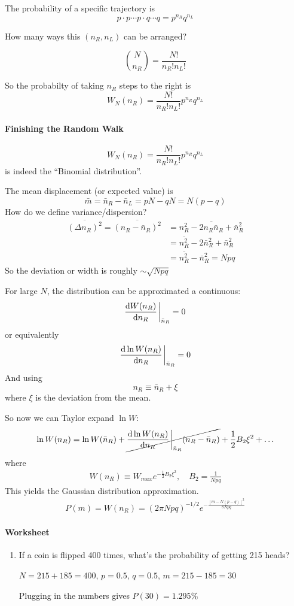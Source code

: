 \documentclass[../main.tex]{subfiles}
\begin{document}
The probability of a specific trajectory is
\[p\cdot p \cdots p \cdot q\cdots q = p^{n_R} q^{n_L}\]

How many ways this $(n_R, n_L)$ can be arranged?

\[\binom{N}{n_R} = \frac{N!}{n_R! n_L!}\]

So the probabilty of taking $n_R$ steps to the right is
\[W_N (n_R) = \frac{N!}{n_R! n_L!} p^{n_R} q^{n_L} \]

\newpage
{}
\paragraph*{Finishing the Random Walk}
\[W_N (n_R) = \frac{N!}{n_R! n_L!} p^{n_R} q^{n_L} \]
is indeed the ``Binomial distribution''.

The mean displacement (or expected value) is
\[\bar m = \bar n_R -\bar n_L = pN - qN = N(p - q)\]
How do we define variance/dispersion?
\begin{align*}
    \overline{(\Delta n_R)^2} = \overline{(n_R - \bar n_R)^2} &= \overline{n_R^2 - 2n_R \bar n_R + \bar n_R^2} \\
    &= \overline{n_R^2} - 2\bar n_R^2 + \bar n_R^2 \\
    &= \overline{n_R^2} - \bar n_R^2 = Npq
\end{align*}
So the deviation or width is roughly $\sim \sqrt{Npq}$

For large $N$, the distribution can be approximated a continuous:
\[\dv{W(n_R)}{n_R}\eval_{\bar n_R} = 0\]
or equivalently
\[\dv{\ln W(n_R)}{n_R}\eval_{\bar n_R} = 0\]
And using 
\[n_R \equiv \bar n_R + \xi\]
where $\xi$ is the deviation from the mean.

So now we can Taylor expand $\ln W$:
\begin{align*}
    \ln W(n_R) = \ln W(\bar n_R) + \cancel{\dv{\ln W(n_R)}{n_R}\eval_{\bar n_R} (n_R - \bar n_R)} + \frac{1}{2} B_2 \xi^2 + \dots
\end{align*}
where
\begin{align*}
    W(n_R) \equiv W_{max} e^{-\frac{1}{2} B_2 \xi^2}, \quad B_2 = \frac{1}{Npq}
\end{align*}
This yields the Gaussian distribution approximation.
\begin{align*}
    P(m) = W(n_R) = (2\pi Npq)^{-1/2} e^{-\frac{[m - N(p-q)]^2}{8Npq}}
\end{align*}

\paragraph*{Worksheet}
\begin{enumerate}
    \item If a coin is flipped 400 times, what's the probability of getting 215 heads?
    
    $N = 215 + 185 = 400$, $p = 0.5$, $q = 0.5$, $m = 215 - 185 = 30$

    Plugging in the numbers gives $P(30) = 1.295\%$
\end{enumerate}
\end{document}
